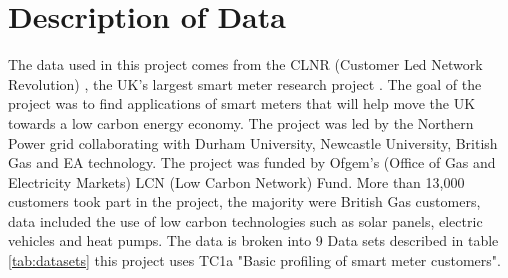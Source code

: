 \chapter{Description of Data}
\label{DataDesc}


The data used in this project comes from the CLNR (Customer Led Network Revolution) \cite{customerlednetworkrevolution}, the UK's largest smart meter research project \cite{durhamenergyinstitutecustomerlednetworkrevolutiondurhamuniversity}. The goal of the project was to find applications of smart meters that will help move the UK towards a low carbon energy economy. The project was led by the Northern Power grid collaborating with Durham University, Newcastle University, British Gas and EA technology. The project was funded by Ofgem's (Office of Gas and Electricity Markets) LCN (Low Carbon Network) Fund. More than 13,000 customers took part in the project, the majority were British Gas customers, data included the use of low carbon technologies such as solar panels, electric vehicles and heat pumps. The data is broken into 9 Data sets described in table \ref{tab:datasets} this project uses TC1a "Basic profiling of smart meter customers".

